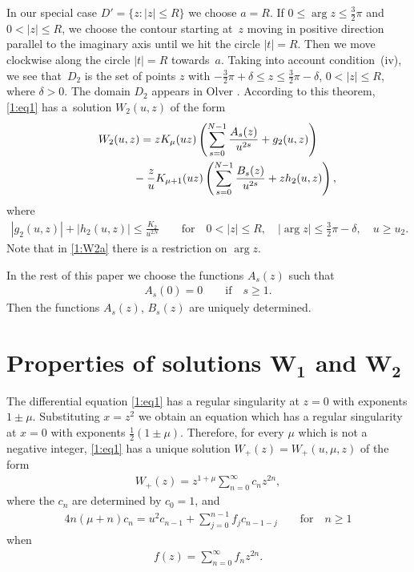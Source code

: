 \documentclass[pdftex]{sigma}
\numberwithin{equation}{section}
\begin{document}
In our special case $D'=\{z\colon |z|\le R\}$ we choose $a=R$. If $0\le\arg z\le \frac32\pi$ and $0<|z|\le R$, we choose the contour starting at~$z$
moving in positive direction parallel to the imaginary axis until we hit the circle $|t|=R$. Then we move clockwise along the circle $|t|=R$ towards~$a$. Taking into account condition~(iv), we see that~$D_2$ is the set of points $z$ with $-\frac32\pi+\delta\le z\le \frac32\pi-\delta$,
$0<|z|\le R$, where $\delta>0$.
The domain $D_2$ appears in Olver \cite[Theorem~D(ii)]{O}. According to this theorem, \eqref{1:eq1} has a~solution $W_2(u,z)$ of the form
\begin{gather}
W_2(u,z)=zK_\mu(uz)\left(\sum_{s=0}^{N-1} \frac{A_s(z)}{u^{2s}}+g_2(u,z)\right)\nonumber\\
\hphantom{W_2(u,z)=}{} -\frac{z}{u}K_{\mu+1}(uz)\left(\sum_{s=0}^{N-1} \frac{B_s(z)}{u^{2s}}+zh_2(u,z)\right),\label{1:W2}
\end{gather}
where
\begin{gather}\label{1:W2a}
 |g_2(u,z)|+|h_2(u,z)|\le \frac{K_2}{u^{2N}}\qquad \text{for} \quad 0<|z|\le R, \quad |\arg z|\le \frac32\pi-\delta, \quad u\ge u_2 .
\end{gather}
Note that in \eqref{1:W2a} there is a restriction on $\arg z$.

In the rest of this paper we choose the functions $A_s(z)$ such that
\begin{gather}\label{1:As}
A_s(0)=0\qquad\text{if} \quad s\ge 1.
\end{gather}
Then the functions $A_s(z)$, $B_s(z)$ are uniquely determined.

\section[Properties of solutions $W_1$ and $W_2$]{Properties of solutions $\boldsymbol{W_1}$ and $\boldsymbol{W_2}$}\label{discussion}

The dif\/ferential equation \eqref{1:eq1} has a regular singularity at $z=0$ with exponents $1\pm \mu$.
Substituting $x=z^2$ we obtain an equation which has a regular singularity at $x=0$ with exponents $\frac12(1\pm\mu)$.
Therefore, for every $\mu$ which is not a negative integer, \eqref{1:eq1} has a unique solution $W_+(z)=W_+(u,\mu,z)$ of the form
\begin{gather*}%
W_+(z)= z^{1+\mu}\sum_{n=0}^\infty c_nz^{2n},
\end{gather*}
where the $c_n$ are determined by $c_0=1$, and
\begin{gather*}
4n(\mu+n)c_n=u^2c_{n-1}+\sum_{j=0}^{n-1}f_jc_{n-1-j} \qquad\text{for} \quad n\ge 1
\end{gather*}
when
\begin{gather*}
f(z)=\sum_{n=0}^\infty f_n z^{2n} .
\end{gather*}
\end{document}
